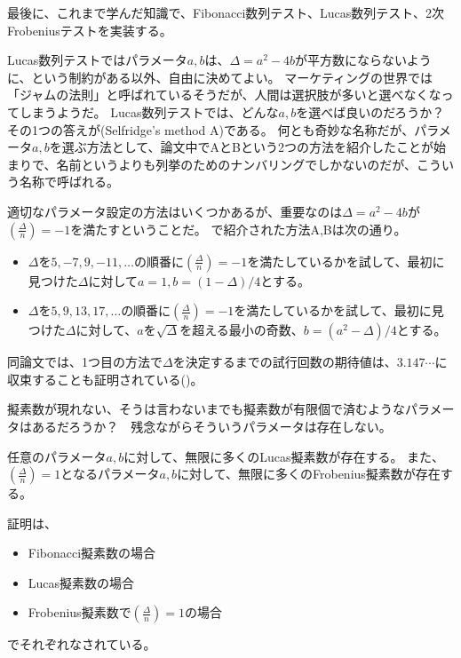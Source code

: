 最後に、これまで学んだ知識で、Fibonacci数列テスト、Lucas数列テスト、2次Frobeniusテストを実装する。


Lucas数列テストではパラメータ$a,b$は、$\Delta=a^2-4b$が平方数にならないように、という制約がある以外、自由に決めてよい。
マーケティングの世界では「ジャムの法則」と呼ばれているそうだが、人間は選択肢が多いと選べなくなってしまうようだ。
Lucas数列テストでは、どんな$a,b$を選べば良いのだろうか？　その1つの答えが(Selfridge's method A)\cite{selfridge_method}である。
何とも奇妙な名称だが、パラメータ$a,b$を選ぶ方法として、論文中でAとBという2つの方法を紹介したことが始まりで、名前というよりも列挙のためのナンバリングでしかないのだが、こういう名称で呼ばれる。

適切なパラメータ設定の方法はいくつかあるが、重要なのは$\Delta=a^2-4b$が$\left(\frac{\Delta}{n}\right)=-1$を満たすということだ。
\cite{selfridge_method}で紹介された方法A,Bは次の通り。
\begin{itemize}
 \item $\Delta$を$5,-7,9,-11,\ldots$の順番に$\left(\frac{\Delta}{n}\right)=-1$を満たしているかを試して、最初に見つけた$\Delta$に対して$a=1,b=(1-\Delta)/4$とする。
 \item $\Delta$を$5,9,13,17,\ldots$の順番に$\left(\frac{\Delta}{n}\right)=-1$を満たしているかを試して、最初に見つけた$\Delta$に対して、$a$を$\sqrt{\Delta}$を超える最小の奇数、$b=(a^2-\Delta)/4$とする。
\end{itemize}
同論文では、1つ目の方法で$\Delta$を決定するまでの試行回数の期待値は、$3.147\cdots$に収束することも証明されている(\cite[定理9]{selfridge_method})。


擬素数が現れない、そうは言わないまでも擬素数が有限個で済むようなパラメータはあるだろうか？　残念ながらそういうパラメータは存在しない。

\begin{Theo}{}{}
任意のパラメータ$a,b$に対して、無限に多くのLucas擬素数が存在する。
また、$\left(\frac{\Delta}{n}\right)=1$となるパラメータ$a,b$に対して、無限に多くのFrobenius擬素数が存在する。
\end{Theo}

証明は、
\begin{itemize}
 \item Fibonacci擬素数の場合\cite{fibonacci_pseudoprimes_infinite}
 \item Lucas擬素数の場合\cite{lucas_pseudoprimes_infinite}
 \item Frobenius擬素数で$\left(\frac{\Delta}{n}\right)=1$の場合\cite{frobenius_pseudoprimes_infinite}
\end{itemize}
でそれぞれなされている。

